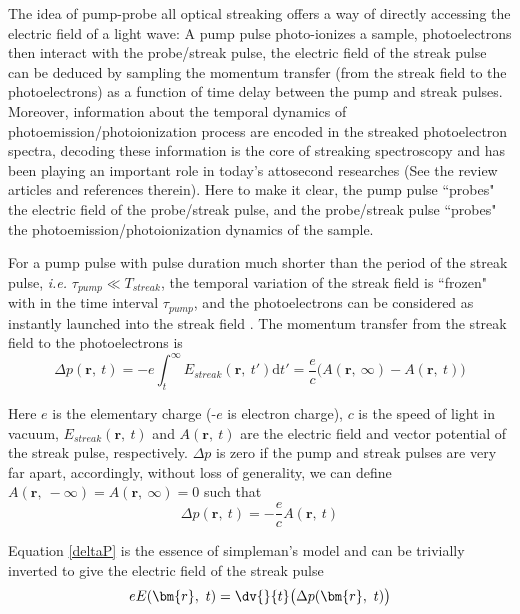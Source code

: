 The idea of pump-probe all optical streaking offers a way of directly accessing the electric field of a light wave: A pump pulse photo-ionizes a sample, photoelectrons then interact with the probe/streak pulse, the electric field of the streak pulse can be deduced by sampling the momentum transfer (from the streak field to the photoelectrons) as a function of time delay between the pump and streak pulses. Moreover, information about the temporal dynamics of photoemission/photoionization process are encoded in the streaked photoelectron spectra, decoding these information is the core of streaking spectroscopy and has been playing an important role in today's attosecond researches (See the review articles \cite{AttoPhysRev2009,AttoMetrologyRev2014} and references therein). Here to make it clear, the pump pulse ``probes" the electric field of the probe/streak pulse, and the probe/streak pulse ``probes" the photoemission/photoionization dynamics of the sample.


For a pump pulse with pulse duration much shorter than the period of the streak pulse, {\it i.e.\@} $\tau_{pump} \ll T_{streak}$, the temporal variation of the streak field is ``frozen" with in the time interval $\tau_{pump}$, and the photoelectrons can be considered as instantly launched into the streak field \cite{fsFieldMeasurement2004}. The momentum transfer  from the streak field to the photoelectrons is
\begin{equation}
    \Delta p(\bm{r},\ t) = -e\int_{t}^{\infty}E_{streak}(\bm{r},\ t') \mathrm{d} t' = \frac{e}{c} \big( A(\bm{r},\ \infty) - A(\bm{r},\ t) \big)
\end{equation}

Here $e$ is the elementary charge (-$e$ is electron charge), $c$ is the speed of light in vacuum, $E_{streak}(\bm{r},\ t)$ and $A(\bm{r},\ t)$ are the electric field and vector potential of the streak pulse, respectively. $\Delta p$ is zero if the pump and streak pulses are very far apart, accordingly, without loss of generality, we can define $A(\bm{r},\ -\infty) = A (\bm{r},\ \infty) =0$ such that
\begin{equation}\label{deltaP}
    \Delta p(\bm{r},\ t) = -\frac{e}{c} A(\bm{r},\ t)
\end{equation}

Equation \ref{deltaP} is the essence of simpleman's model and can be trivially inverted to give the electric field of the streak pulse
\begin{equation}
    eE(\bm{r},\ t) = \dv{}{t} \big( \Delta p(\bm{r},\ t) \big)
\end{equation}

